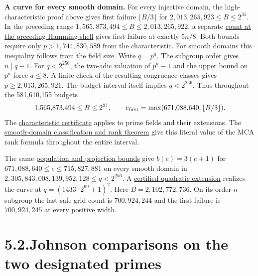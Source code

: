 \documentclass[11pt,letterpaper]{article}
\begin{document}
\textbf{A curve for every smooth domain.}
For every injective domain, the high-characteristic proof above gives first failure
$\lfloor B/3\rfloor$ for $2{,}013{,}265{,}923\le B\le2^{31}$. In the preceding range
$1{,}565{,}873{,}494\le B\le2{,}013{,}265{,}922$, a separate
\href{https://github.com/SlopDotCash/proximityprize/blob/34ad8f82ba3449b5304777c7871f07aea71783f4/ArkLib/Research/ProximityGap/Frontier/FiveEighthsPlateauThreshold.lean}{count at the preceding Hamming shell} gives first failure at exactly $5n/8$. Both bounds require only $p>1{,}744{,}830{,}589$ from the characteristic.
For smooth domains this inequality follows from the field size.
Write $q=p^a$. The subgroup order gives $n\mid q-1$. For $q<2^{256}$, the two-adic valuation of
$p^a-1$ and the upper bound on $p^a$ force $a\le8$. A finite check of the resulting
congruence classes gives $p\ge2{,}013{,}265{,}921$. The budget interval itself implies
$q<2^{256}$. Thus throughout the 581,610,155 budgets
\[
 1{,}565{,}873{,}494 \le B \le 2^{31},\qquad
 e_{\rm first}=\max(671{,}088{,}640,\lfloor B/3\rfloor).
\]
The \href{https://github.com/SlopDotCash/proximityprize/blob/e5b8fd3690581b735905d5bcb6a282eaf09c8683/ArkLib/Research/ProximityGap/Frontier/SmoothCubicCharacteristic.lean}{characteristic certificate} applies to prime fields and their extensions.
The \href{https://github.com/SlopDotCash/proximityprize/blob/62ac67e95fd43b01b9ed3561fc4550e4169120f2/ArkLib/Research/ProximityGap/Frontier/SmoothCubicBudgetWindow.lean}{smooth-domain classification and rank theorem} give this literal value of the MCA rank formula throughout the entire interval.

The same \href{https://github.com/SlopDotCash/proximityprize/blob/34ad8f82ba3449b5304777c7871f07aea71783f4/ArkLib/Research/ProximityGap/Frontier/ThreeHeadThresholdCurve.lean}{population and projection bounds} give
$b(e)=3(e+1)$ for $671{,}088{,}640\le e\le715{,}827{,}881$ on every smooth domain
in $2{,}305{,}843{,}008{,}139{,}952{,}128\le q<2^{256}$. A \href{https://github.com/SlopDotCash/proximityprize/blob/b8257ffb2d5774f33559205ed3e486302b334cdc/ArkLib/Research/ProximityGap/Frontier/QuadraticCubicWindowExample.lean}{certified quadratic extension} realizes the curve at $q=(1433\cdot2^{69}+1)^2$. Here $B=2{,}102{,}772{,}736$. On its order-$n$ subgroup the last safe grid count is $700{,}924{,}244$ and the first failure is $700{,}924{,}245$ at every positive width.

\newpage
\section*{5.2.\quad Johnson comparisons on the two designated primes}
\end{document}
